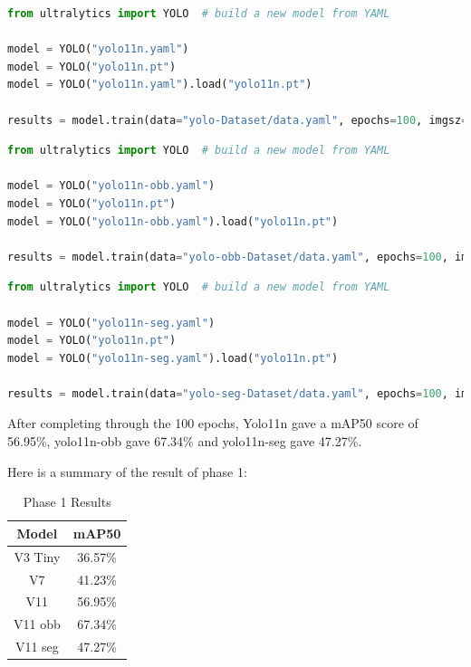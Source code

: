 \lstset{basicstyle=\scriptsize\ttfamily, breaklines=true, breakatwhitespace=true,captionpos=b}
\begin{lstlisting}[language=Python, caption=Yolo11n Training code]
from ultralytics import YOLO  # build a new model from YAML

model = YOLO("yolo11n.yaml")  
model = YOLO("yolo11n.pt") 
model = YOLO("yolo11n.yaml").load("yolo11n.pt")  

results = model.train(data="yolo-Dataset/data.yaml", epochs=100, imgsz=640, plots=True, optimizer='Adam', lr0=0.001, weight_decay=0.0005, momentum=0.937, device=0, val=True, lrf=0.001,resume=True)
\end{lstlisting}

\lstset{basicstyle=\scriptsize\ttfamily, breaklines=true, breakatwhitespace=true,captionpos=b}
\begin{lstlisting}[language=Python, caption=Yolo11n-obb Training code]
from ultralytics import YOLO  # build a new model from YAML

model = YOLO("yolo11n-obb.yaml")  
model = YOLO("yolo11n.pt") 
model = YOLO("yolo11n-obb.yaml").load("yolo11n.pt")  

results = model.train(data="yolo-obb-Dataset/data.yaml", epochs=100, imgsz=640, plots=True, optimizer='Adam', lr0=0.001, weight_decay=0.0005, momentum=0.937, device=0, val=True, lrf=0.001,resume=True)
\end{lstlisting}

\lstset{basicstyle=\scriptsize\ttfamily, breaklines=true, breakatwhitespace=true,captionpos=b}
\begin{lstlisting}[language=Python, caption=Yolo11n-seg Training code]
from ultralytics import YOLO  # build a new model from YAML

model = YOLO("yolo11n-seg.yaml")  
model = YOLO("yolo11n.pt") 
model = YOLO("yolo11n-seg.yaml").load("yolo11n.pt")  

results = model.train(data="yolo-seg-Dataset/data.yaml", epochs=100, imgsz=640, plots=True, optimizer='Adam', lr0=0.001, weight_decay=0.0005, momentum=0.937, device=0, val=True, lrf=0.001,resume=True)
\end{lstlisting}

After completing through the 100 epochs, Yolo11n gave a mAP50 score of 56.95\%, yolo11n-obb gave 67.34\% and yolo11n-seg gave 47.27\%.

Here is a summary of the result of phase 1:

\begin{table}[H]
    \centering
    \begin{tabular}{|c|c|}
        \hline
        \textbf{Model} & \textbf{mAP50} \\
        \hline
        V3 Tiny & 36.57\% \\
        V7 & 41.23\% \\
        V11 & 56.95\% \\
        V11 obb & 67.34\% \\
        V11 seg & 47.27\% \\
        \hline
    \end{tabular}
    \caption{Phase 1 Results}
    \label{tab:model_performance}
\end{table}

